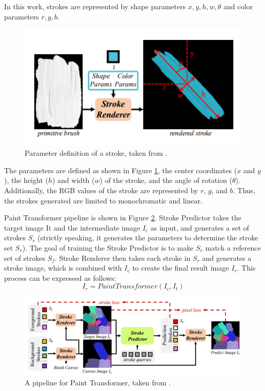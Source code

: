 In this work, strokes are represented by shape parameters ${x, y, h, w, \theta}$ 
and color parameters ${r, g, b}$.
\begin{figure}[h]
    \centering
    \includegraphics[width=110truemm]{resources/3_related_work/stroke-params.png}
    \caption{
        Parameter definition of a stroke,
        taken from \cite{liu2021paint}.
    }
    \label{strokeparams}
\end{figure}
\newline
The parameters are defined as shown in Figure \ref{strokeparams}, the center 
coordinates ($x$ and $y$), the height ($h$) and width ($w$) of the stroke, 
and the angle of rotation ($\theta$). Additionally, the RGB values of the 
stroke are represented by $r$, $g$, and $b$. Thus, the strokes generated are 
limited to monochromatic and linear.

Paint Transformer pipeline is shown in Figure \ref{PTpipeline}.
Stroke Predictor takes the target image It and the intermediate 
image $I_c$ as input, and generates a set of strokes $S_r$
(strictly speaking, it generates the parameters to determine the stroke set $S_r$).
The goal of training the Stroke Predictor is to make $S_r$ match a reference set
of strokes $S_f$. 
Stroke Renderer then takes each stroke in $S_r$ and generates a stroke image, 
which is combined with $I_c$ to create the final result image $I_r$.
This process can be expressed as follows:
\begin{equation}
    \label{painttransformer}
    I_r = PaintTransformer(I_c, I_t)
\end{equation}
\vspace{5mm}
\begin{figure}[t]
    \centering
    \includegraphics[width=150truemm]{resources/3_related_work/PTpipeline.png}
    \caption{
        A pipeline for Paint Transformer,
        taken from \cite{liu2021paint}.
    }
    \label{PTpipeline}
\end{figure}

